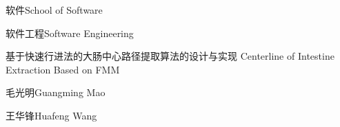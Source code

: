 
\school
{软件}{School of Software}

\major
{软件工程}{Software Engineering}

\thesistitle
{基于快速行进法的大肠中心路径提取算法的设计与实现}
{Centerline of Intestine Extraction Based on FMM}

\thesisauthor
{毛光明}{Guangming Mao}

\teacher
{王华锋}{Huafeng Wang}






